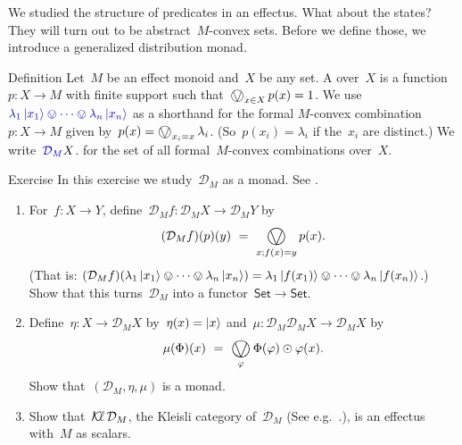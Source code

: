 \documentclass[b]{subfiles}
\begin{document}
\begin{parsec}%
\begin{point}%
We studied the structure of predicates in an effectus.  What about the states?
They will turn out to be abstract~$M$-convex sets.
Before we define those, we introduce a generalized distribution monad.
\end{point}
\begin{point}{Definition}%
Let~$M$ be an effect monoid
    and~$X$ be any set.
A  over~$X$
    is a function~$p\colon X \to M$
    with finite support
    such that~$\bigovee_{x \in X} p(x) = 1$.
We use~$\Define{\lambda_1 \ket{x_1} \ovee \cdots \ovee \lambda_n \ket{x_n}}$
    as a shorthand for the formal $M$-convex combination~$p\colon X \to M$
    given by~$p(x) = \bigovee_{x_i = x} \lambda_i$.
    (So~$p(x_i) = \lambda_i$ if the~$x_i$ are distinct.)
We write~$\Define{\mathcal{D}_M} X$.
    for the set of all formal~$M$-convex combinations over~$X$.
\end{point}
\begin{point}{Exercise}%
    In this exercise we study~$\mathcal{D}_M$ as a monad.
    See \cite{probdistrconv,basmsc}.
\begin{enumerate}
\item
For~$f\colon X \to Y$,
    define~$\mathcal{D}_M f \colon \mathcal{D}_M X \to \mathcal{D}_M Y$
    by
    \begin{equation*}
    (\mathcal{D}_M f)(p)(y) \ =\  \bigovee_{x; f(x)=y} p(x).
    \end{equation*}
    (That is: $(\mathcal{D}_M f) (\lambda_1 \ket{x_1} \ovee \cdots
            \ovee \lambda_n \ket{x_n})
            = \lambda_1 \ket{f(x_1)} \ovee \cdots
            \ovee \lambda_n \ket{f(x_n)} $.)
Show that this turns~$\mathcal{D}_M$ into a functor~$\mathsf{Set} \to \mathsf{Set}$.
\item
Define~$\eta \colon X \to \mathcal{D}_M X$
    by~$\eta(x) = \ket{x}$
    and~$\mu\colon \mathcal{D}_M \mathcal{D}_M X \to \mathcal{D}_M X$ by
    \begin{equation*}
        \mu(\Phi)(x) \ = \ 
        \bigovee_{\varphi}
        \Phi(\varphi) \odot \varphi(x).
    \end{equation*}
Show that~$(\mathcal{D}_M, \eta,\mu)$
    is a monad.
\item
    Show that~$\operatorname{\mathcal{K}\!\ell} \mathcal{D}_M$,
    the Kleisli category of~$\mathcal{D}_M$
    (See e.g.~\cite[\S 2.6]{basmsc}.),
    is an effectus
    with~$M$ as scalars.
\end{enumerate}

\end{point}
\end{parsec}
\end{document}
